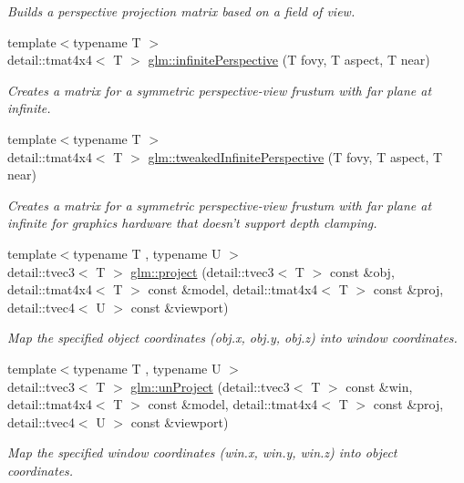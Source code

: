 \begin{DoxyCompactItemize}
\begin{DoxyCompactList}\small\item\em Builds a perspective projection matrix based on a field of view. \end{DoxyCompactList}\item 
{\footnotesize template$<$typename T $>$ }\\detail\-::tmat4x4$<$ T $>$ \hyperlink{group__gtc__matrix__transform_ga414f3cfe1af5619acebd5c28cf6bd45c}{glm\-::infinite\-Perspective} (T fovy, T aspect, T near)
\begin{DoxyCompactList}\small\item\em Creates a matrix for a symmetric perspective-\/view frustum with far plane at infinite. \end{DoxyCompactList}\item 
{\footnotesize template$<$typename T $>$ }\\detail\-::tmat4x4$<$ T $>$ \hyperlink{group__gtc__matrix__transform_ga42299b3ef778f1d6120032da73b0ef87}{glm\-::tweaked\-Infinite\-Perspective} (T fovy, T aspect, T near)
\begin{DoxyCompactList}\small\item\em Creates a matrix for a symmetric perspective-\/view frustum with far plane at infinite for graphics hardware that doesn't support depth clamping. \end{DoxyCompactList}\item 
{\footnotesize template$<$typename T , typename U $>$ }\\detail\-::tvec3$<$ T $>$ \hyperlink{group__gtc__matrix__transform_ga6f081067aeffc662410dfbabb25f9fdc}{glm\-::project} (detail\-::tvec3$<$ T $>$ const \&obj, detail\-::tmat4x4$<$ T $>$ const \&model, detail\-::tmat4x4$<$ T $>$ const \&proj, detail\-::tvec4$<$ U $>$ const \&viewport)
\begin{DoxyCompactList}\small\item\em Map the specified object coordinates (obj.\-x, obj.\-y, obj.\-z) into window coordinates. \end{DoxyCompactList}\item 
{\footnotesize template$<$typename T , typename U $>$ }\\detail\-::tvec3$<$ T $>$ \hyperlink{group__gtc__matrix__transform_ga540d5f6bb3f41e5dfa38d6ebd8771765}{glm\-::un\-Project} (detail\-::tvec3$<$ T $>$ const \&win, detail\-::tmat4x4$<$ T $>$ const \&model, detail\-::tmat4x4$<$ T $>$ const \&proj, detail\-::tvec4$<$ U $>$ const \&viewport)
\begin{DoxyCompactList}\small\item\em Map the specified window coordinates (win.\-x, win.\-y, win.\-z) into object coordinates. \end{DoxyCompactList}\item 

\end{DoxyCompactItemize}
